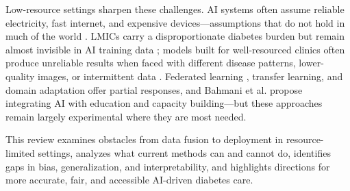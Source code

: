 Low-resource settings sharpen these challenges. AI systems often assume reliable electricity, fast internet, and expensive devices—assumptions that do not hold in much of the world \cite{mackenzie2023diabetes, ghosh2025artificial, olusanya2024mitigating}. LMICs carry a disproportionate diabetes burden but remain almost invisible in AI training data \cite{raj2024federated, wang2024ai}; models built for well-resourced clinics often produce unreliable results when faced with different disease patterns, lower-quality images, or intermittent data \cite{zhang2025systematic, olusanya2024mitigating}. Federated learning \cite{fahmy2025exploring, bai2024federated}, transfer learning, and domain adaptation \cite{contreras2018artificial, chen2024crossmodality} offer partial responses, and Bahmani et al. \cite{bahmani2025achieving} propose integrating AI with education and capacity building—but these approaches remain largely experimental where they are most needed.

This review examines obstacles from data fusion to deployment in resource-limited settings, analyzes what current methods can and cannot do, identifies gaps in bias, generalization, and interpretability, and highlights directions for more accurate, fair, and accessible AI-driven diabetes care.
